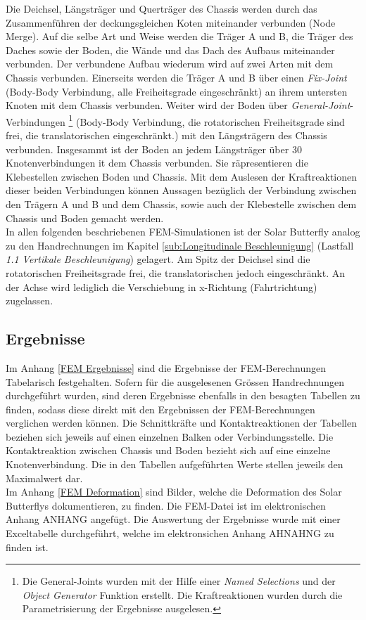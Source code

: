 Die Deichsel, Längsträger und Querträger des Chassis werden durch das Zusammenführen der deckungsgleichen Koten miteinander verbunden (Node Merge). Auf die selbe Art und Weise werden die Träger A und B, die Träger des Daches sowie der Boden, die Wände und das Dach des Aufbaus miteinander verbunden. Der verbundene Aufbau wiederum wird auf zwei Arten mit dem Chassis verbunden. Einerseits werden die Träger A und B über einen \emph{Fix-Joint} (Body-Body Verbindung, alle Freiheitsgrade eingeschränkt) an ihrem untersten Knoten mit dem Chassis verbunden. Weiter wird der Boden über \emph{General-Joint}-Verbindungen%
\footnote{Die General-Joints wurden mit der Hilfe einer \emph{Named Selections} und der \emph{Object Generator} Funktion erstellt. Die Kraftreaktionen wurden durch die Parametrisierung der Ergebnisse ausgelesen.}
(Body-Body Verbindung, die rotatorischen Freiheitsgrade sind frei, die translatorischen eingeschränkt.) mit den Längsträgern des Chassis verbunden. Insgesammt ist der Boden an jedem Längsträger über 30 Knotenverbindungen it dem Chassis verbunden. Sie räpresentieren die Klebestellen zwischen Boden und Chassis. Mit dem Auslesen der Kraftreaktionen dieser beiden Verbindungen können Aussagen bezüglich der Verbindung zwischen den Trägern A und B und dem Chassis, sowie auch der Klebestelle zwischen dem Chassis und Boden gemacht werden.\\
In allen folgenden beschriebenen FEM-Simulationen ist der Solar Butterfly analog zu den Handrechnungen im Kapitel \ref{sub:Longitudinale Beschleunigung} (Lastfall \emph{1.1 Vertikale Beschleunigung}) gelagert. Am Spitz der Deichsel sind die rotatorischen Freiheitsgrade frei, die translatorischen jedoch eingeschränkt. An der Achse wird lediglich die Verschiebung in x-Richtung (Fahrtrichtung) zugelassen.

\subsection{Ergebnisse}
Im Anhang \ref{FEM Ergebnisse} sind die Ergebnisse der FEM-Berechnungen Tabelarisch festgehalten. Sofern für die ausgelesenen Grössen Handrechnungen durchgeführt wurden, sind deren Ergebnisse ebenfalls in den besagten Tabellen zu finden, sodass diese direkt mit den Ergebnissen der FEM-Berechnungen verglichen werden können. Die Schnittkräfte und Kontaktreaktionen der Tabellen beziehen sich jeweils auf einen einzelnen Balken oder Verbindungsstelle. Die Kontaktreaktion zwischen Chassis und Boden bezieht sich auf eine einzelne Knotenverbindung. Die in den Tabellen aufgeführten Werte stellen jeweils den Maximalwert dar.\\
Im Anhang \ref{FEM Deformation} sind Bilder, welche die Deformation des Solar Butterflys dokumentieren, zu finden. Die FEM-Datei ist im elektronischen Anhang ANHANG angefügt. Die Auswertung der Ergebnisse wurde mit einer Exceltabelle durchgeführt, welche im elektronsichen Anhang AHNAHNG zu finden ist.


